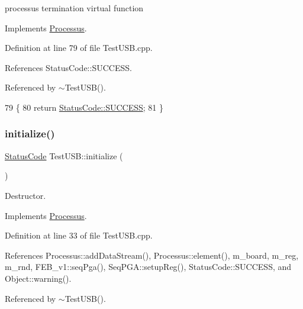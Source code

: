 processus termination virtual function 

Implements \hyperlink{classProcessus_aba93d691f031bdb18ae4b8afb1b2e856}{Processus}.



Definition at line 79 of file Test\+U\+S\+B.\+cpp.



References Status\+Code\+::\+S\+U\+C\+C\+E\+SS.



Referenced by $\sim$\+Test\+U\+S\+B().


\begin{DoxyCode}
79                                \{  
80   \textcolor{keywordflow}{return} \hyperlink{classStatusCode_a6f565cbeadc76d14c72f047e5e85eb4badd0da38d3ba0d922efd1f4619bc37ad8}{StatusCode::SUCCESS};
81 \}
\end{DoxyCode}
\mbox{\label{classTestUSB_ae7cca13f49e4180c93f9f5a3cbd05985}} 
\subsubsection{\texorpdfstring{initialize()}{initialize()}}
{\footnotesize\ttfamily \hyperlink{classStatusCode}{Status\+Code} Test\+U\+S\+B\+::initialize (\begin{DoxyParamCaption}{ }\end{DoxyParamCaption})\hspace{0.3cm}{\ttfamily [virtual]}}



Destructor. 



Implements \hyperlink{classProcessus_aee88ad7b77ae7319cf8b128e9dd2ea11}{Processus}.



Definition at line 33 of file Test\+U\+S\+B.\+cpp.



References Processus\+::add\+Data\+Stream(), Processus\+::element(), m\+\_\+board, m\+\_\+reg, m\+\_\+rnd, F\+E\+B\+\_\+v1\+::seq\+Pga(), Seq\+P\+G\+A\+::setup\+Reg(), Status\+Code\+::\+S\+U\+C\+C\+E\+SS, and Object\+::warning().



Referenced by $\sim$\+Test\+U\+S\+B().


